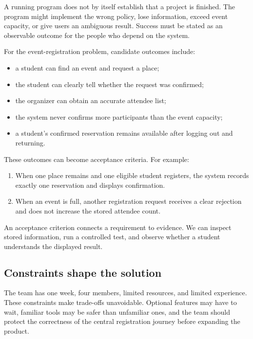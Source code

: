 \documentclass[11pt]{article}
\begin{document}
A running program does not by itself establish that a project is finished. The program might implement the wrong policy, lose information, exceed event capacity, or give users an ambiguous result. Success must be stated as an observable outcome for the people who depend on the system.

For the event-registration problem, candidate outcomes include:
\begin{itemize}
  \item a student can find an event and request a place;
  \item the student can clearly tell whether the request was confirmed;
  \item the organizer can obtain an accurate attendee list;
  \item the system never confirms more participants than the event capacity;
  \item a student's confirmed reservation remains available after logging out and returning.
\end{itemize}

These outcomes can become acceptance criteria. For example:
\begin{conceptcheck}
\begin{enumerate}
  \item When one place remains and one eligible student registers, the system records exactly one reservation and displays confirmation.
  \item When an event is full, another registration request receives a clear rejection and does not increase the stored attendee count.
\end{enumerate}
\end{conceptcheck}

An acceptance criterion connects a requirement to evidence. We can inspect stored information, run a controlled test, and observe whether a student understands the displayed result.

\subsection{Constraints shape the solution}

The team has one week, four members, limited resources, and limited experience. These constraints make trade-offs unavoidable. Optional features may have to wait, familiar tools may be safer than unfamiliar ones, and the team should protect the correctness of the central registration journey before expanding the product.
\end{document}
